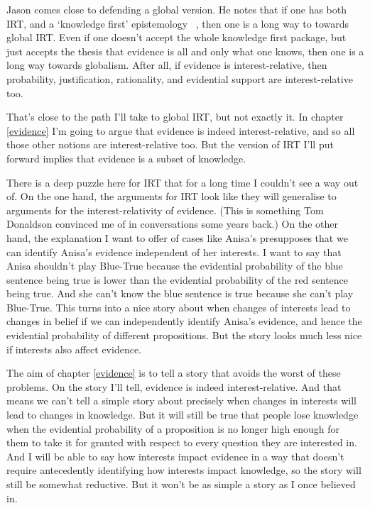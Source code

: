 \documentclass[11pt,]{book}
\begin{document}
Jason \citet{Stanley2005} comes close to defending a global version. He notes that if one has both IRT, and a `knowledge first' epistemology ~\citep{Williamson2000}, then one is a long way to towards global IRT. Even if one doesn't accept the whole knowledge first package, but just accepts the thesis that evidence is all and only what one knows, then one is a long way towards globalism. After all, if evidence is interest-relative, then probability, justification, rationality, and evidential support are interest-relative too.

That's close to the path I'll take to global IRT, but not exactly it. In chapter \ref{evidence} I'm going to argue that evidence is indeed interest-relative, and so all those other notions are interest-relative too. But the version of IRT I'll put forward implies that evidence is a subset of knowledge.

There is a deep puzzle here for IRT that for a long time I couldn't see a way out of. On the one hand, the arguments for IRT look like they will generalise to arguments for the interest-relativity of evidence. (This is something Tom Donaldson convinced me of in conversations some years back.) On the other hand, the explanation I want to offer of cases like Anisa's presupposes that we can identify Anisa's evidence independent of her interests. I want to say that Anisa shouldn't play Blue-True because the evidential probability of the blue sentence being true is lower than the evidential probability of the red sentence being true. And she can't know the blue sentence is true because she can't play Blue-True. This turns into a nice story about when changes of interests lead to changes in belief if we can independently identify Anisa's evidence, and hence the evidential probability of different propositions. But the story looks much less nice if interests also affect evidence.

The aim of chapter \ref{evidence} is to tell a story that avoids the worst of these problems. On the story I'll tell, evidence is indeed interest-relative. And that means we can't tell a simple story about precisely when changes in interests will lead to changes in knowledge. But it will still be true that people lose knowledge when the evidential probability of a proposition is no longer high enough for them to take it for granted with respect to every question they are interested in. And I will be able to say how interests impact evidence in a way that doesn't require antecedently identifying how interests impact knowledge, so the story will still be somewhat reductive. But it won't be as simple a story as I once believed in.
\end{document}
